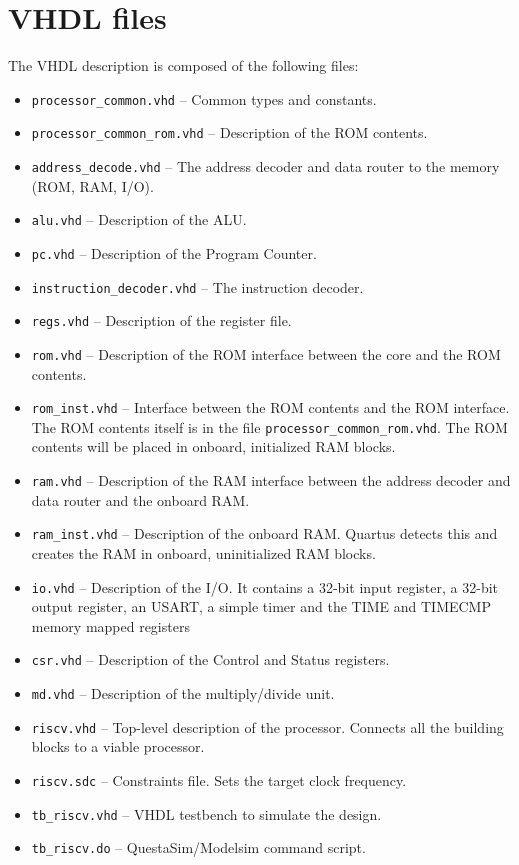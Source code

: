 \documentclass[12pt]{article}
\begin{document}
\section{VHDL files}
The VHDL description is composed of the following files:

\begin{itemize}
\item \lstinline|processor_common.vhd| -- Common types and constants.
\item \lstinline|processor_common_rom.vhd| -- Description of the ROM contents.
\item \lstinline|address_decode.vhd| -- The address decoder and data router to the memory (ROM, RAM, I/O).
\item \lstinline|alu.vhd| -- Description of the ALU.
\item \lstinline|pc.vhd| -- Description of the Program Counter.
\item \lstinline|instruction_decoder.vhd| -- The instruction decoder.
\item \lstinline|regs.vhd| -- Description of the register file.
\item \lstinline|rom.vhd| -- Description of the ROM interface between the core and the ROM contents.
\item \lstinline|rom_inst.vhd| -- Interface between the ROM contents and the ROM interface. The ROM contents itself is in the file \lstinline|processor_common_rom.vhd|. The ROM contents will be placed in onboard, initialized RAM blocks. 
\item \lstinline|ram.vhd| -- Description of the RAM interface between the address decoder and data router and the onboard RAM.
\item \lstinline|ram_inst.vhd| -- Description of the onboard RAM. Quartus detects this and creates the RAM in onboard, uninitialized RAM blocks.
\item \lstinline|io.vhd| -- Description of the I/O. It contains a 32-bit input register, a 32-bit output register, an USART, a simple timer and the TIME and TIMECMP memory mapped registers
\item \lstinline|csr.vhd| -- Description of the Control and Status registers.
\item \lstinline|md.vhd| -- Description of the multiply/divide unit.
\item \lstinline|riscv.vhd| -- Top-level description of the processor. Connects all the building blocks to a viable processor.
\item \lstinline|riscv.sdc| -- Constraints file. Sets the target clock frequency.
\item \lstinline|tb_riscv.vhd| -- VHDL testbench to simulate the design.
\item \lstinline|tb_riscv.do| -- QuestaSim/Modelsim command script.
\end{itemize}
\end{document}
